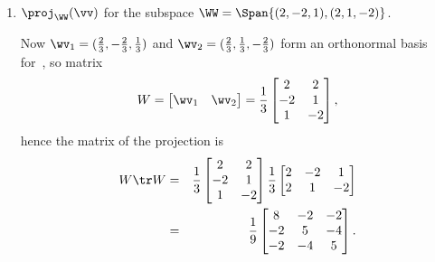 \begin{example}
\begin{enumerate}
\item \(\proj_\WW(\vv)\) for the subspace \(\WW=\Span\{(2,-2,1),(2,1,-2)\}\).
\begin{solution} 
Now \(\wv_1=(\frac23,-\frac23,\frac13)\) and  \(\wv_2=(\frac23,\frac13,-\frac23)\) form an orthonormal basis for~\WW, so matrix
\begin{equation*}
W=\begin{bmatrix} \wv_1&\wv_2 \end{bmatrix}
=\frac13\begin{bmatrix} 2&2\\-2&1\\1&-2 \end{bmatrix},
\end{equation*}
hence the matrix of the projection is
\begin{eqnarray*}
W\tr W&=&\frac13\begin{bmatrix} 2&2\\-2&1\\1&-2 \end{bmatrix}
\frac13\begin{bmatrix} 2&-2&1\\ 2&1&-2\end{bmatrix}
\\&=&\frac19\begin{bmatrix} 8&-2&-2\\-2&5&-4\\-2&-4&5 \end{bmatrix}.
\end{eqnarray*}
\end{solution}



\end{enumerate}
\end{example}
